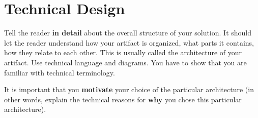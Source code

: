 \section{Technical Design}
\label{sec:techdesign}
\begin{instructions}
Tell the reader \textbf{in detail} about the overall structure of your solution. It should let the reader understand how your artifact is organized, what parts it contains, how they relate to each other. This is usually called the architecture of your artifact. Use technical language and diagrams. You have to show that you are familiar with technical terminology.

It is important that you \textbf{motivate} your choice of the particular architecture (in other words, explain the technical reasons for \textbf{why} you chose this particular architecture).
\end{instructions}
